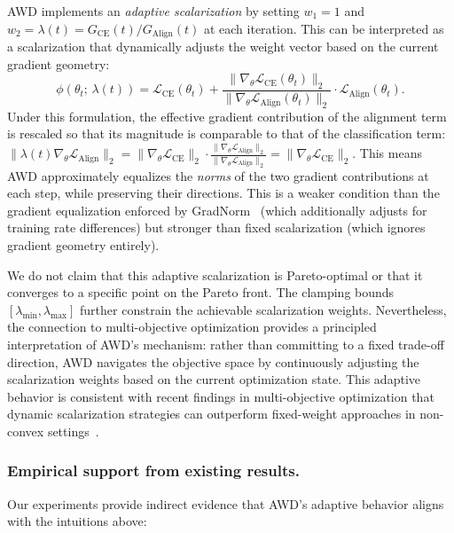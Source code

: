 \documentclass[pdflatex,sn-mathphys-num]{sn-jnl}
\theoremstyle{thmstyleone}
\theoremstyle{thmstyletwo}
\theoremstyle{thmstylethree}
\begin{document}
AWD implements an \emph{adaptive scalarization} by setting $w_1 = 1$ and $w_2 = \lambda(t) = G_{\text{CE}}(t) / G_{\text{Align}}(t)$ at each iteration. This can be interpreted as a scalarization that dynamically adjusts the weight vector based on the current gradient geometry:
\begin{equation}
\phi(\theta_t;\, \lambda(t)) = \mathcal{L}_{\text{CE}}(\theta_t) + \frac{\|  \nabla_\theta \mathcal{L}_{\text{CE}}(\theta_t) \|_2}{\| \nabla_\theta \mathcal{L}_{\text{Align}}(\theta_t) \|_2} \cdot \mathcal{L}_{\text{Align}}(\theta_t).
\label{eq:adaptive_scalarization}
\end{equation}
Under this formulation, the effective gradient contribution of the alignment term is rescaled so that its magnitude is comparable to that of the classification term:
$\| \lambda(t) \nabla_\theta \mathcal{L}_{\text{Align}} \|_2 = \| \nabla_\theta \mathcal{L}_{\text{CE}} \|_2 \cdot \frac{\| \nabla_\theta \mathcal{L}_{\text{Align}} \|_2}{\| \nabla_\theta \mathcal{L}_{\text{Align}} \|_2} = \| \nabla_\theta \mathcal{L}_{\text{CE}} \|_2$.
This means AWD approximately equalizes the \emph{norms} of the two gradient contributions at each step, while preserving their directions. This is a weaker condition than the gradient equalization enforced by GradNorm~\cite{chen2018gradnorm} (which additionally adjusts for training rate differences) but stronger than fixed scalarization (which ignores gradient geometry entirely).

We do not claim that this adaptive scalarization is Pareto-optimal or that it converges to a specific point on the Pareto front. The clamping bounds $[\lambda_{\min}, \lambda_{\max}]$ further constrain the achievable scalarization weights. Nevertheless, the connection to multi-objective optimization provides a principled interpretation of AWD's mechanism: rather than committing to a fixed trade-off direction, AWD navigates the objective space by continuously adjusting the scalarization weights based on the current optimization state. This adaptive behavior is consistent with recent findings in multi-objective optimization that dynamic scalarization strategies can outperform fixed-weight approaches in non-convex settings~\cite{liu2021conflictaverse,navon2022nashmtl}.


\subsubsection{Empirical support from existing results.}
Our experiments provide indirect evidence that AWD's adaptive behavior aligns with the intuitions above:
\end{document}
